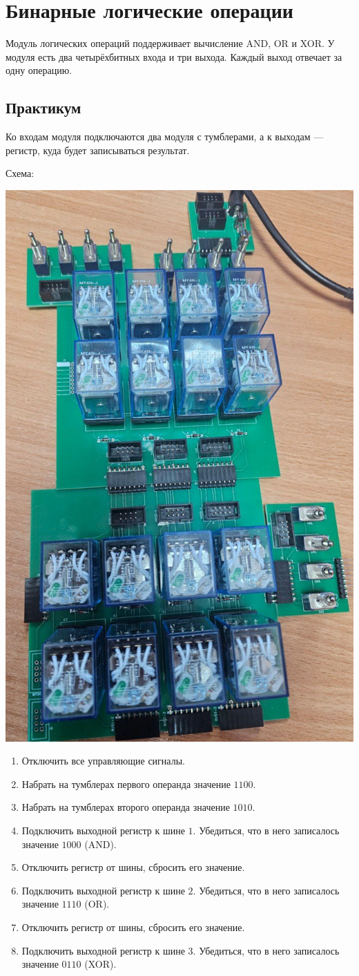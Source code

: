 \documentclass{book}
\begin{document}
\section{Бинарные логические операции}

Модуль логических операций поддерживает вычисление AND, OR и XOR.
У модуля есть два четырёхбитных входа и три выхода.
Каждый выход отвечает за одну операцию.

\subsection{Практикум}

Ко входам модуля подключаются два модуля с тумблерами, а к выходам --- регистр,
куда будет записываться результат.

Схема:

\includegraphics[width=0.5\columnwidth]{photo/logic.jpg}

\begin{enumerate}
    \item Отключить все управляющие сигналы.
    \item Набрать на тумблерах первого операнда значение $1100$.
    \item Набрать на тумблерах второго операнда значение $1010$.
    \item Подключить выходной регистр к шине $1$. Убедиться, что в него записалось значение $1000$ (AND).
    \item Отключить регистр от шины, сбросить его значение.
    \item Подключить выходной регистр к шине $2$. Убедиться, что в него записалось значение $1110$ (OR).
    \item Отключить регистр от шины, сбросить его значение.
    \item Подключить выходной регистр к шине $3$. Убедиться, что в него записалось значение $0110$ (XOR).
\end{enumerate}
\end{document}

